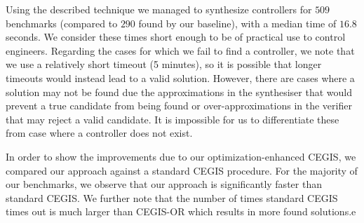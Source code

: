 \documentclass[sigconf]{llncs}
\begin{document}
Using the described technique we managed to synthesize controllers for $509$ benchmarks (compared to $290$ found by our baseline), with a median time of $16.8$ seconds.
We consider these times short enough to be of practical use to control engineers.
Regarding the cases for which we fail to find a controller, we note that we use a
relatively short timeout (5 minutes), so it is possible that longer timeouts would instead lead to a
valid solution. However, there are cases where a solution may not be found due the
approximations in the synthesiser that would prevent a true candidate from being found
or over-approximations in the verifier that may reject a valid candidate.
It is impossible for us to differentiate these from case where a controller does not exist.

In order to show the improvements due to our optimization-enhanced CEGIS, we
compared our approach against a standard CEGIS procedure.  For the majority of
our benchmarks, we observe that our approach is significantly faster than
standard CEGIS. We further note that the number of times standard CEGIS times
out is much larger than CEGIS-OR which results in more found solutions.e 

\end{document}
